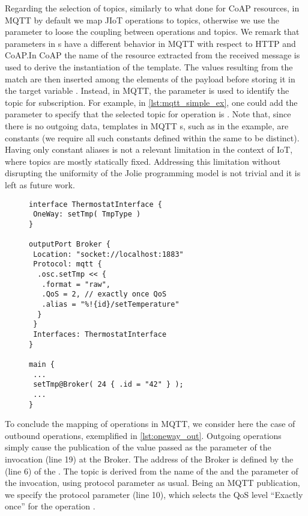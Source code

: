 Regarding the selection of topics, similarly to what done for CoAP resources, in
MQTT by default we map JIoT operations to topics, otherwise we use the
 parameter  to loose the coupling between operations
and topics. We remark that  parameters in s have a different
behavior in MQTT with respect to HTTP and CoAP.\@ In CoAP the name of the resource extracted
from the received message is used to derive the instantiation of the
 template. The values resulting from the match are then
inserted among the elements of the payload before storing it in the target
variable . Instead, in MQTT, the  parameter is used to
identify the topic for subscription. For example, in \cref{lst:mqtt_simple_ex},
one could add the  parameter  to specify that the selected topic for operation
 is . Note that, since
there is no outgoing data, templates in MQTT s, such as
 in the example, are constants (we require all such
constants defined within the same
 to be distinct). Having only constant aliases is not a relevant
limitation in the context of IoT, where topics are mostly statically fixed.
Addressing this limitation without disrupting the uniformity of the Jolie
programming model is not trivial and it is left as future work.


\begin{figure}[t]
\begin{lstlisting}[basicstyle=\footnotesize\ttfamily,caption={Example of
outgoing MQTT \code{OneWay} communication.},label=lst:oneway_out]
interface ThermostatInterface {
 OneWay: setTmp( TmpType )
}

outputPort Broker {
 Location: "socket://localhost:1883"
 Protocol: mqtt {
  .osc.setTmp << {
   .format = "raw",
   .QoS = 2, // exactly once QoS
   .alias = "%!{id}/setTemperature"
  }
 }
 Interfaces: ThermostatInterface
}

main {
 ...
 setTmp@Broker( 24 { .id = "42" } );
 ...
}
\end{lstlisting}
\end{figure}

To conclude the mapping of  operations in MQTT, we consider here
the case of outbound operations, exemplified in \cref{lst:oneway_out}.
%
Outgoing  operations simply cause the publication of the value
passed as the parameter of the invocation (line 19) at the Broker. The
address of the Broker is defined by the  (line 6) of the
 . The topic is derived from the name of the
 and the parameter of the invocation, using protocol parameter
 as usual. Being an MQTT publication, we specify the
 protocol parameter (line 10), which selects the QoS level
``Exactly once'' for the operation .


